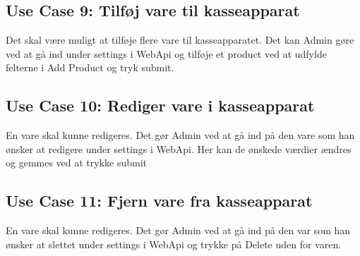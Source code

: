 \subsection*{Use Case 9: Tilføj vare til kasseapparat}
Det skal være muligt at tilføje flere vare til kasseapparatet. Det kan Admin gøre ved at gå ind under settings i WebApi og tilføje et product ved at udfylde felterne i Add Product og tryk submit. 

\subsection*{Use Case 10: Rediger vare i kasseapparat}
En vare skal kunne redigeres. Det gør Admin ved at gå ind på den vare som han ønsker at redigere under settings i WebApi. Her kan de ønskede værdier ændres og gemmes ved at trykke submit

\subsection*{Use Case 11: Fjern vare fra kasseapparat}
En vare skal kunne redigeres. Det gør Admin ved at gå ind på den var som han ønsker at slettet under settings i WebApi og trykke på Delete uden for varen.
